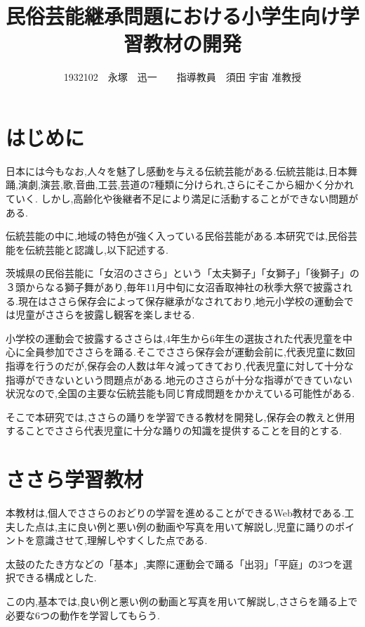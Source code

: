 \documentclass[twocolumn,10pt,a4j]{ltjsarticle}
\title{民俗芸能継承問題における小学生向け学習教材の開発}
\author{1932102　永塚　迅一　　指導教員　須田 宇宙 准教授}
\date{}
\begin{document}
\maketitle
\section{はじめに}


日本には今もなお,人々を魅了し感動を与える伝統芸能がある.伝統芸能は,日本舞踊,演劇,演芸,歌,音曲,工芸,芸道の7種類に分けられ,さらにそこから細かく分かれていく.
しかし,高齢化や後継者不足により満足に活動することができない問題がある.

伝統芸能の中に,地域の特色が強く入っている民俗芸能がある.本研究では,民俗芸能を伝統芸能と認識し,以下記述する.

茨城県の民俗芸能に「女沼のささら」という「太夫獅子」「女獅子」「後獅子」の３頭からなる獅子舞があり,毎年11月中旬に女沼香取神社の秋季大祭で披露される\cite{suda2018}.現在はささら保存会によって保存継承がなされており,地元小学校の運動会では児童がささらを披露し観客を楽しませる.

小学校の運動会で披露するささらは,4年生から6年生の選抜された代表児童を中心に全員参加でささらを踊る.そこでささら保存会が運動会前に,代表児童に数回指導を行うのだが,保存会の人数は年々減ってきており,代表児童に対して十分な指導ができないという問題点がある.地元のささらが十分な指導ができていない状況なので,全国の主要な伝統芸能も同じ育成問題をかかえている可能性がある.

そこで本研究では,ささらの踊りを学習できる教材を開発し,保存会の教えと併用することでささら代表児童に十分な踊りの知識を提供することを目的とする.

\section{ささら学習教材}
本教材は,個人でささらのおどりの学習を進めることができるWeb教材である.工夫した点は,主に良い例と悪い例の動画や写真を用いて解説し,児童に踊りのポイントを意識させて,理解しやすくした点である.

太鼓のたたき方などの「基本」,実際に運動会で踊る「出羽」「平庭」の3つを選択できる構成とした.

この内,基本では,良い例と悪い例の動画と写真を用いて解説し,ささらを踊る上で必要な6つの動作を学習してもらう.
\end{document}

